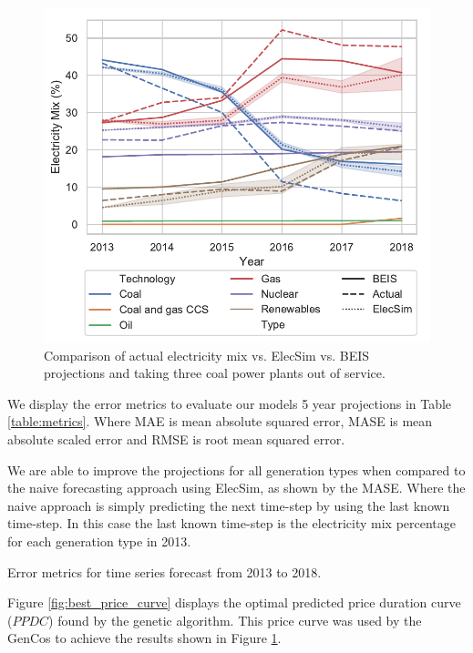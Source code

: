 \begin{figure}
	\centering
	\includegraphics[width=\columnwidth]{Chapter4/figures/e-Energy-2020/results/throughout_years_beis_elecsim_comparison_coal_dropout_leg_below.pdf}
	\caption{Comparison of actual electricity mix vs. ElecSim vs. BEIS projections and taking three coal power plants out of service.}
	\label{fig:beis_elecsim_historic_comparison}
\end{figure}



We display the error metrics to evaluate our models 5 year projections in Table \ref{table:metrics}. Where MAE is mean absolute squared error, MASE is mean absolute scaled error and RMSE is root mean squared error.

We are able to improve the projections for all generation types when compared to the naive forecasting approach using ElecSim, as shown by the MASE. Where the naive approach is simply predicting the next time-step by using the last known time-step. In this case the last known time-step is the electricity mix percentage for each generation type in 2013. 

\begin{table}[htb]
	\centering
	\caption{Error metrics for time series forecast from 2013 to 2018.}
	\label{table:metrics}
\end{table}

Figure \ref{fig:best_price_curve} displays the optimal predicted price duration curve ($PPDC$) found by the genetic algorithm. This price curve was used by the GenCos to achieve the results shown in Figure \ref{fig:beis_elecsim_historic_comparison}. 

